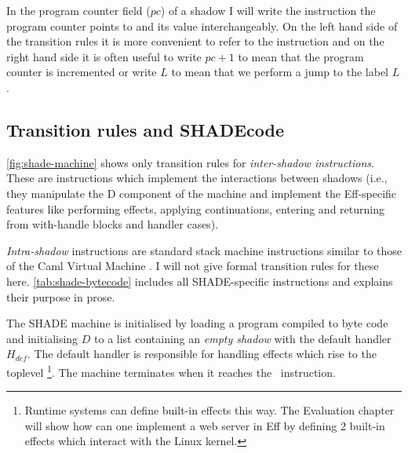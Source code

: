 \documentclass[class=article, crop=false]{standalone}
\begin{document}
In the program counter field ($pc$) of a shadow I will write the instruction
the program counter points to and its value interchangeably. On the left hand
side of the transition rules it is more convenient to refer to the instruction
and on the right hand side it is often useful to write $pc+1$ to mean that the
program counter is incremented or write $L$ to mean that we perform a jump to
the label $L$.

\subsection{Transition rules and SHADEcode}

\autoref{fig:shade-machine} shows only transition rules for \emph{inter-shadow
instructions}. These are instructions which implement the interactions between
shadows (i.e., they manipulate the D component of the machine and implement the
Eff-specific features like performing effects, applying continuations, entering
and returning from with-handle blocks and handler cases).

\emph{Intra-shadow} instructions are standard stack machine instructions similar
to those of the Caml Virtual Machine \cite{caml-vm}. I will not give formal
transition rules for these here. \autoref{tab:shade-bytecode} includes all
SHADE-specific instructions and explains their purpose in prose.

The SHADE machine is initialised by loading a program compiled to byte code
and initialising $D$ to a list containing an \emph{empty shadow} with the
default handler $H_{def}$. The default handler is responsible for handling
effects which rise to the toplevel%
\footnote{Runtime systems can define built-in effects this way. The Evaluation
chapter will show how can one implement a web server in Eff by defining 2
built-in effects which interact with the Linux kernel.}.
The machine terminates when it reaches the \vmHalt\ instruction.
\end{document}
